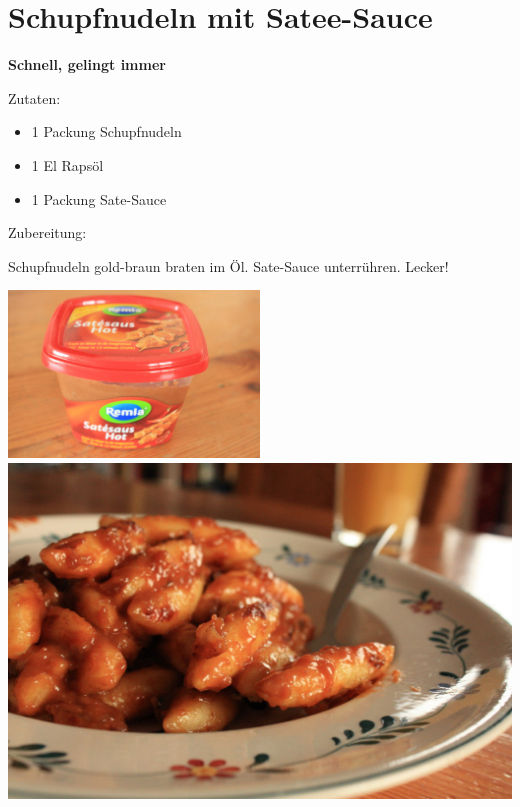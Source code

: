 \section{Schupfnudeln mit Satee-Sauce}

\textbf{Schnell, gelingt immer}

Zutaten:
\begin{itemize}
    \item 1 Packung Schupfnudeln
    \item 1 El Rapsöl
    \item 1 Packung Sate-Sauce
\end{itemize}

\noindent Zubereitung:

\noindent Schupfnudeln gold-braun braten im Öl. Sate-Sauce unterrühren. Lecker!

\newpage
\mbox{}
\vfill
\begin{center}
    \includegraphics[width=0.5\textwidth]{Schupfnudeln-Satee/IMG_6114._small.jpg}
    \vfill
    \includegraphics[width=\textwidth]{Schupfnudeln-Satee/IMG_6108._small.jpg}
\end{center}
\vfill
\mbox{ }
\newpage
